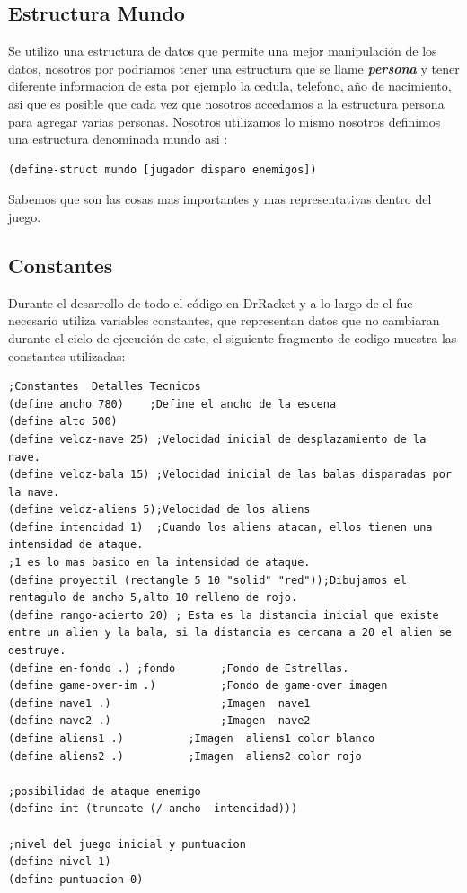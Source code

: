 \documentclass[a4paper]{article} %
\begin{document}
\subsection{Estructura Mundo}
Se utilizo una estructura de datos que permite una mejor manipulación de los datos, nosotros por podriamos tener una estructura que se llame \emph{\textbf{persona}} y tener diferente informacion de esta por ejemplo la cedula, telefono, año de nacimiento, asi que es posible que cada vez que nosotros accedamos a la estructura persona para agregar varias personas. Nosotros utilizamos lo mismo nosotros definimos una estructura denominada mundo asi :
\begin{lstlisting}
(define-struct mundo [jugador disparo enemigos])
\end{lstlisting}
Sabemos que son las cosas mas importantes y mas representativas dentro del juego.

\subsection{Constantes}
Durante el desarrollo de todo el código en DrRacket y a lo largo de el fue necesario utiliza variables constantes, que representan datos que no cambiaran durante el ciclo de ejecución de este, el siguiente fragmento de codigo muestra las constantes utilizadas:
\begin{lstlisting}
;Constantes  Detalles Tecnicos
(define ancho 780)    ;Define el ancho de la escena 
(define alto 500)
(define veloz-nave 25) ;Velocidad inicial de desplazamiento de la nave.
(define veloz-bala 15) ;Velocidad inicial de las balas disparadas por la nave.
(define veloz-aliens 5);Velocidad de los aliens
(define intencidad 1)  ;Cuando los aliens atacan, ellos tienen una intensidad de ataque.
;1 es lo mas basico en la intensidad de ataque.
(define proyectil (rectangle 5 10 "solid" "red"));Dibujamos el rentagulo de ancho 5,alto 10 relleno de rojo.
(define rango-acierto 20) ; Esta es la distancia inicial que existe entre un alien y la bala, si la distancia es cercana a 20 el alien se destruye.
(define en-fondo .) ;fondo       ;Fondo de Estrellas.
(define game-over-im .)          ;Fondo de game-over imagen
(define nave1 .)                 ;Imagen  nave1
(define nave2 .)     			 ;Imagen  nave2
(define aliens1 .)    		;Imagen  aliens1 color blanco
(define aliens2 .)     		;Imagen  aliens2 color rojo

;posibilidad de ataque enemigo
(define int (truncate (/ ancho  intencidad))) 

;nivel del juego inicial y puntuacion
(define nivel 1)
(define puntuacion 0)

\end{lstlisting}
\end{document}
